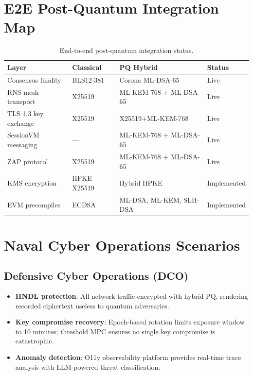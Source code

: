 \documentclass[11pt,letterpaper]{article}
\begin{document}
\section{E2E Post-Quantum Integration Map}

\begin{table}[H]
\centering
\begin{tabular}{@{}llll@{}}
\toprule
\textbf{Layer} & \textbf{Classical} & \textbf{PQ Hybrid} & \textbf{Status} \\
\midrule
Consensus finality & BLS12-381 & Corona ML-DSA-65 & Live \\
RNS mesh transport & X25519 & ML-KEM-768 + ML-DSA-65 & Live \\
TLS 1.3 key exchange & X25519 & X25519+ML-KEM-768 & Live \\
SessionVM messaging & --- & ML-KEM-768 + ML-DSA-65 & Live \\
ZAP protocol & X25519 & ML-KEM-768 + ML-DSA-65 & Live \\
KMS encryption & HPKE-X25519 & Hybrid HPKE & Implemented \\
EVM precompiles & ECDSA & ML-DSA, ML-KEM, SLH-DSA & Implemented \\
\bottomrule
\end{tabular}
\caption{End-to-end post-quantum integration status.}
\label{tab:pq-status}
\end{table}

\section{Naval Cyber Operations Scenarios}

\subsection{Defensive Cyber Operations (DCO)}

\begin{itemize}
\item \textbf{HNDL protection}: All network traffic encrypted with hybrid PQ, rendering recorded ciphertext useless to quantum adversaries.
\item \textbf{Key compromise recovery}: Epoch-based rotation limits exposure window to 10 minutes; threshold MPC ensures no single key compromise is catastrophic.
\item \textbf{Anomaly detection}: O11y observability platform provides real-time trace analysis with LLM-powered threat classification.
\end{itemize}
\end{document}
